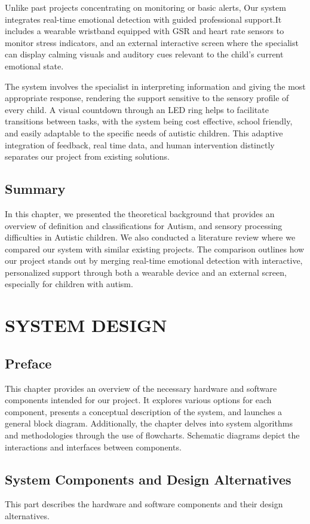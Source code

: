 \documentclass[a4paper,12pt]{report}
\begin{document}
Unlike past projects concentrating on monitoring or basic alerts, Our system integrates real-time emotional detection with guided professional support.It includes a wearable wristband equipped with GSR and heart rate sensors to monitor stress indicators, and an external interactive screen where the specialist can display calming visuals and auditory cues relevant to the child's current emotional state.

The system involves the specialist in interpreting information and giving the most appropriate response, rendering the support sensitive to the sensory profile of every child. A visual countdown through an LED ring helps to facilitate transitions between tasks, with the system being cost effective, school friendly, and easily adaptable to the specific needs of autistic children. This adaptive integration of feedback, real time data, and human intervention distinctly separates our project from existing solutions.

\section{Summary}
In this chapter, we presented the theoretical background that provides an overview of definition and classifications for Autism, and sensory processing difficulties in Autistic children. We also conducted a literature review where we compared our system with similar existing projects. The comparison outlines how our project stands out by merging real-time emotional detection with interactive, personalized support through both a wearable device and an external screen, especially for children with autism.  
\chapter{ SYSTEM DESIGN}
\section{Preface}
This chapter provides an overview of the necessary hardware and software components intended for our project. It explores various options for each component, presents a conceptual description of the system, and launches a general block diagram. Additionally, the chapter delves into system algorithms and methodologies through the use of flowcharts. Schematic diagrams depict the interactions and interfaces between components.
\section{ System Components and Design Alternatives}
This part describes the hardware and software components and their design alternatives.
\end{document}
